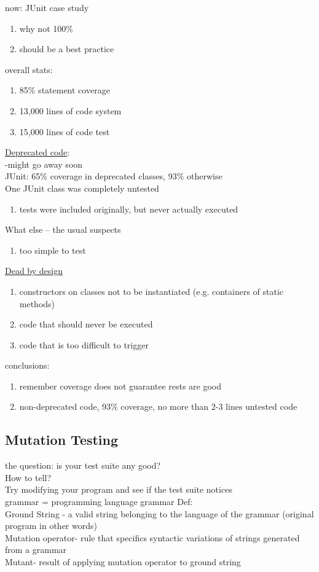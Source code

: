 \documentclass[10pt,usletter]{article}
\newcommand{\tab}[1][1cm]{\hspace*{#1}}
\begin{document}
now: JUnit case study
\begin{enumerate}
\item why not 100\%
\item should be a best practice
\end{enumerate}
overall stats:
\begin{enumerate}
\item 85\% statement coverage
\item 13,000 lines of code system
\item 15,000 lines of code test
\end{enumerate}
\underline{Deprecated code}:\\
-might go away soon \\
JUnit: 65\% coverage in deprecated classes, 93\% otherwise\\
One JUnit class was completely untested
\begin{enumerate}
\item tests were included originally, but never actually executed
\end{enumerate}
What else -- the usual suspects
\begin{enumerate}
\item too simple to test\\
\end{enumerate}
\underline{Dead by design}
\begin{enumerate}
\item constructors on classes not to be instantiated (e.g. containers of static methods)
\item code that should never be executed
\item code that is too difficult to trigger
\end{enumerate}
conclusions:
\begin{enumerate}
\item remember coverage does not guarantee rests are good
\item non-deprecated code, 93\% coverage, no more than 2-3 lines untested code
\end{enumerate}
\subsection*{Mutation Testing}
the question: is your test suite any good?\\
How to tell?\\ 
\tab Try modifying your program and see if the test suite notices\\
grammar = programming language grammar
Def: \\
\tab Ground String - a valid string belonging to the language of the grammar (original program in other words)\\
\tab Mutation operator- rule that specifics syntactic variations of strings generated from a grammar\\
\tab Mutant- result of applying mutation operator to ground string\\
\end{document}
